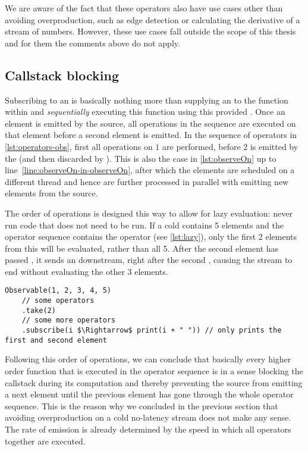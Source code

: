 We are aware of the fact that these operators also have use cases other than avoiding overproduction, such as edge detection or calculating the derivative of a stream of numbers. However, these use cases fall outside the scope of this thesis and for them the comments above do not apply.

\subsection{Callstack blocking}
Subscribing to an \obs is basically nothing more than supplying an \obv to the function within  and \emph{sequentially} executing this function using this provided \obv. Once an element is emitted by the source, all operations in the \obs sequence are executed on that element before a second element is emitted. In the sequence of operators in \autoref{lst:operators-obs}, first all operations on $1$ are performed, before $2$ is emitted by the \obs (and then discarded by ). This is also the case in \autoref{lst:observeOn} up to line~\ref{line:observeOn-in-observeOn}, after which the elements are scheduled on a different thread and hence are further processed in parallel with emitting new elements from the source.

The order of operations is designed this way to allow for lazy evaluation: never run code that does not need to be run. If a cold \obs contains 5 elements and the operator sequence contains the operator  (see \autoref{lst:lazy}), only the first 2 elements from this \obs will be evaluated, rather than all 5. After the second element has passed , it sends an  downstream, right after the second , causing the stream to end without evaluating the other 3 elements. 

\begin{minipage}{\linewidth}
\begin{lstlisting}[style=ScalaStyle, caption={Lazy evaluation}, label={lst:lazy}]
Observable(1, 2, 3, 4, 5)
    // some operators
    .take(2)
    // some more operators
    .subscribe(i $\Rightarrow$ print(i + " ")) // only prints the first and second element
\end{lstlisting}
\end{minipage}

Following this order of operations, we can conclude that basically every higher order function that is executed in the operator sequence is in a sense blocking the callstack during its computation and thereby preventing the source from emitting a next element until the previous element has gone through the whole operator sequence. This is the reason why we concluded in the previous section that avoiding overproduction on a cold no-latency stream does not make any sense. The rate of emission is already determined by the speed in which all operators together are executed.

